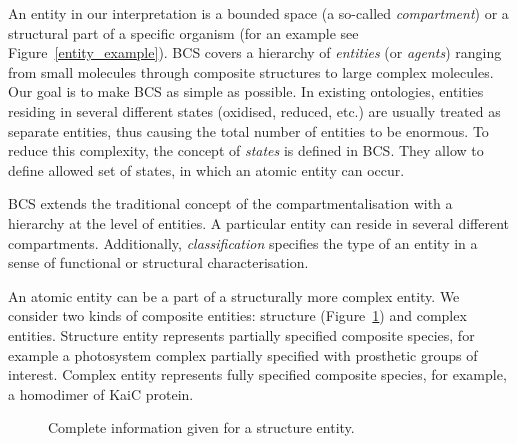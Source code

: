 \documentclass[12pt]{fithesis2}
\begin{document}
An entity in our interpretation is a bounded space (a so-called \emph{compartment}) or a structural part of a specific organism (for an example see Figure~\ref{entity_example}). BCS covers a hierarchy of \emph{entities} (or \emph{agents}) ranging from small molecules through composite structures to large complex molecules. Our goal is to make BCS as simple as possible. In existing ontologies, entities residing in several different states (oxidised, reduced, etc.) are usually treated as separate entities, thus causing the total number of entities to be enormous. To reduce this complexity, the concept of \emph{states} is defined in BCS. They allow to define allowed set of states, in which an atomic entity can occur.

BCS extends the traditional concept of the compartmentalisation with a hierarchy at the level of entities. A particular entity can reside in several different compartments. Additionally, \emph{classification} specifies the type of an entity in a sense of functional or structural characterisation.

An atomic entity can be a part of a structurally more complex entity. We consider two kinds of composite entities: structure (Figure~\ref{structure_example}) and complex entities. Structure entity represents partially specified composite species, for example a photosystem complex partially specified with prosthetic groups of interest. Complex entity represents fully specified composite species, for example, a homodimer of KaiC protein.

\begin{figure}[!h]
\begin{center}
\end{center}
\caption{Complete information given for a structure entity.}\label{structure_example}
\end{figure}
\end{document}
